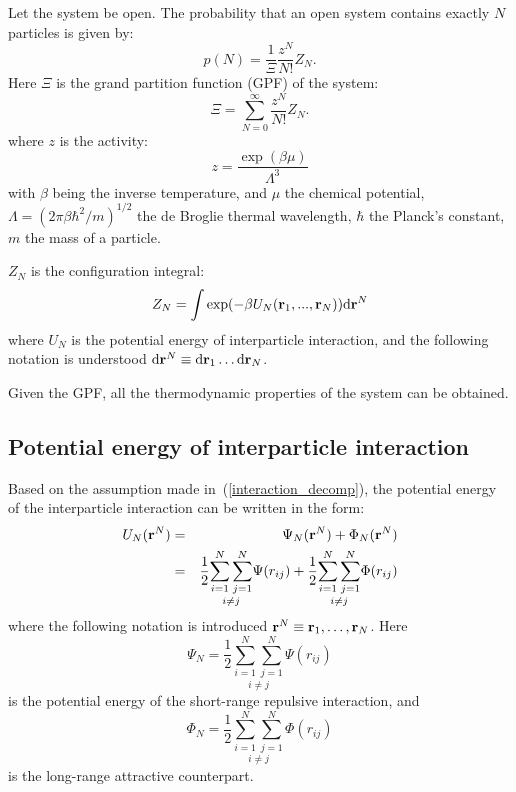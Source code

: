 Let the system be open. The probability that an open system contains exactly $N$ particles is given by:
\begin{equation}
	p(N)=\frac{1}{\Xi}\frac{z^N}{N!}Z_N.
\end{equation}
Here $\Xi$ is the grand partition function (GPF) of the system:
\begin{equation}
	\Xi=\sum_{N=0}^{\infty}\frac{z^N}{N!}Z_N.
\end{equation}
where $z$ is the activity:
\begin{equation}
	z = \frac{\exp(\beta\mu)}{\Lambda^3}
\end{equation}
with $\beta$ being the inverse temperature, and $\mu$ the chemical potential, $\Lambda = (2\pi\beta\hbar^2/m)^{1/2}$ the de Broglie thermal wavelength, $\hbar$ the Planck's constant, $m$ the mass of a particle.

$Z_N$ is the configuration integral:
\begin{equation}
	Z_N = \int\exp(-\beta U_N(\vb {r}_1,...,\vb{r}_N)){\rm d}\vb{r}^N
\end{equation}
where $U_N$ is the potential energy of interparticle interaction, and the following notation is understood ${\rm d} \vb{r}^N \equiv {\rm d}{\vb r_1} \dotsc {\rm d}{\vb r_N}$.

Given the GPF, all the thermodynamic properties of the system can be obtained.

\subsection{\label{sec:potential} Potential energy of interparticle interaction}

Based on the assumption made in~(\ref{interaction_decomp}), the potential energy of the interparticle interaction can be written in the form:
\begin{eqnarray}
	U_N(\vb r^N) &=& \Psi_N(\vb r^N) + \Phi_N (\vb r^N) 
	\nonumber\\
	&=&\frac12 \underset{i\neq j}{\sum_{i=1}^N \sum_{j=1}^N} \Psi(r_{ij}) 
	+ \frac12 \underset{i\neq j}{\sum_{i=1}^N \sum_{j=1}^N} \Phi(r_{ij})	
\end{eqnarray}
where the following notation is introduced $\vb r^N \equiv \vb r_1, \dotsc, \vb r_N$.
Here 
\begin{equation}
	\Psi_N = \frac12 \underset{i\neq j}{\sum_{i=1}^N \sum_{j=1}^N} \Psi(r_{ij})
\end{equation}
is the potential energy of the short-range repulsive interaction, and
\begin{equation}
	\Phi_N = \frac12 \underset{i\neq j}{\sum_{i=1}^N \sum_{j=1}^N} \Phi(r_{ij})
\end{equation}
is the long-range attractive counterpart.

